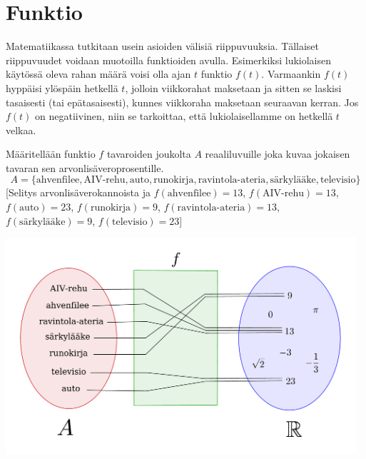 \chapter{Funktio}

Matematiikassa tutkitaan usein asioiden välisiä riippuvuuksia. Tällaiset riippuvuudet voidaan muotoilla funktioiden avulla. Esimerkiksi lukiolaisen käytössä oleva rahan määrä voisi olla ajan $t$ funktio $f(t)$.  Varmaankin $f(t)$ 
hyppäisi ylöspäin hetkellä $t$, jolloin viikkorahat maksetaan ja sitten se laskisi tasaisesti (tai epätasaisesti), kunnes viikkoraha maksetaan seuraavan kerran.  Jos $f(t)$ on negatiivinen, niin se tarkoittaa, että lukiolaisellamme on hetkellä $t$ velkaa.


\begin{esimerkki}
Määritellään funktio $f$ tavaroiden joukolta $A$ reaaliluvuille joka kuvaa jokaisen tavaran sen arvonlisäveroprosentille.
\[A = \{\text{ahvenfilee}, \text{AIV-rehu}, \text{auto}, \text{runokirja}, \text{ravintola-ateria}, \text{särkylääke}, \text{televisio}\}\]
[Selitys arvonlisäverokannoista ja $f(\text{ahvenfilee}) = 13$, $f(\text{AIV-rehu}) = 13$, $f(\text{auto}) = 23$, $f(\text{runokirja}) = 9$, $f(\text{ravintola-ateria}) = 13$, $f(\text{särkylääke}) = 9$, $f(\text{televisio}) = 23$]
\begin{center}
\includegraphics[width=13cm]{03-funktiot/kuvia/funktiokone.pdf}
\end{center}
\end{esimerkki}

